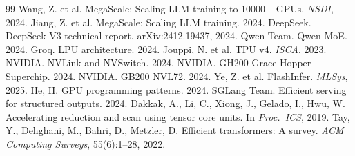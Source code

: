 \documentclass[10pt]{article}
\begin{document}
\begin{thebibliography}{99}
 Wang, Z. et al. MegaScale: Scaling LLM training to 10000+ GPUs. \emph{NSDI}, 2024.
 Jiang, Z. et al. MegaScale: Scaling LLM training. 2024.
 DeepSeek. DeepSeek-V3 technical report. arXiv:2412.19437, 2024.
 Qwen Team. Qwen-MoE. 2024.
 Groq. LPU architecture. 2024.
 Jouppi, N. et al. TPU v4. \emph{ISCA}, 2023.
 NVIDIA. NVLink and NVSwitch. 2024.
 NVIDIA. GH200 Grace Hopper Superchip. 2024.
 NVIDIA. GB200 NVL72. 2024.
 Ye, Z. et al. FlashInfer. \emph{MLSys}, 2025.
 He, H. GPU programming patterns. 2024.
 SGLang Team. Efficient serving for structured outputs. 2024.
 Dakkak, A., Li, C., Xiong, J., Gelado, I., Hwu, W. Accelerating reduction and scan using tensor core units. In \emph{Proc.\ ICS}, 2019.
 Tay, Y., Dehghani, M., Bahri, D., Metzler, D. Efficient transformers: A survey. \emph{ACM Computing Surveys}, 55(6):1--28, 2022.
\end{thebibliography}
\end{document}
